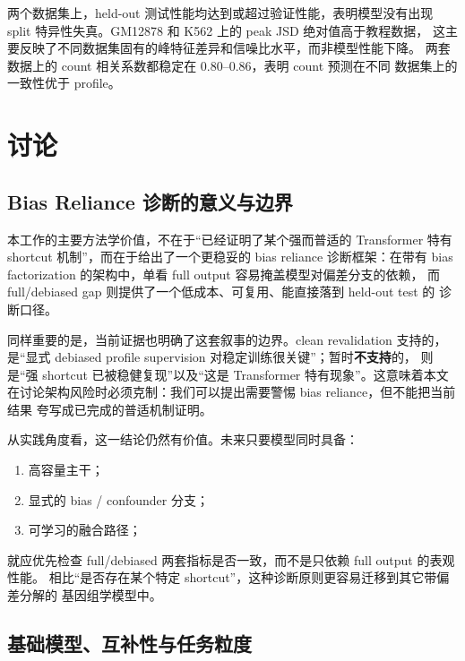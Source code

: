 \documentclass[11pt,a4paper]{ctexart}
\begin{document}
两个数据集上，held-out 测试性能均达到或超过验证性能，表明模型没有出现
split 特异性失真。GM12878 和 K562 上的 peak JSD 绝对值高于教程数据，
这主要反映了不同数据集固有的峰特征差异和信噪比水平，而非模型性能下降。
两套数据上的 count 相关系数都稳定在 0.80--0.86，表明 count 预测在不同
数据集上的一致性优于 profile。

\section{讨论}
\label{sec:discussion}

\subsection{Bias Reliance 诊断的意义与边界}

本工作的主要方法学价值，不在于“已经证明了某个强而普适的 Transformer 特有
shortcut 机制”，而在于给出了一个更稳妥的 bias reliance 诊断框架：在带有
bias factorization 的架构中，单看 full output 容易掩盖模型对偏差分支的依赖，
而 full/debiased gap 则提供了一个低成本、可复用、能直接落到 held-out test 的
诊断口径。

同样重要的是，当前证据也明确了这套叙事的边界。clean revalidation 支持的，
是“显式 debiased profile supervision 对稳定训练很关键”；暂时\textbf{不支持}的，
则是“强 shortcut 已被稳健复现”以及“这是 Transformer 特有现象”。这意味着本文
在讨论架构风险时必须克制：我们可以提出需要警惕 bias reliance，但不能把当前结果
夸写成已完成的普适机制证明。

从实践角度看，这一结论仍然有价值。未来只要模型同时具备：
\begin{enumerate}[leftmargin=2em]
  \item 高容量主干；
  \item 显式的 bias / confounder 分支；
  \item 可学习的融合路径；
\end{enumerate}
就应优先检查 full/debiased 两套指标是否一致，而不是只依赖 full output 的表观性能。
相比“是否存在某个特定 shortcut”，这种诊断原则更容易迁移到其它带偏差分解的
基因组学模型中。

\subsection{基础模型、互补性与任务粒度}
\end{document}
